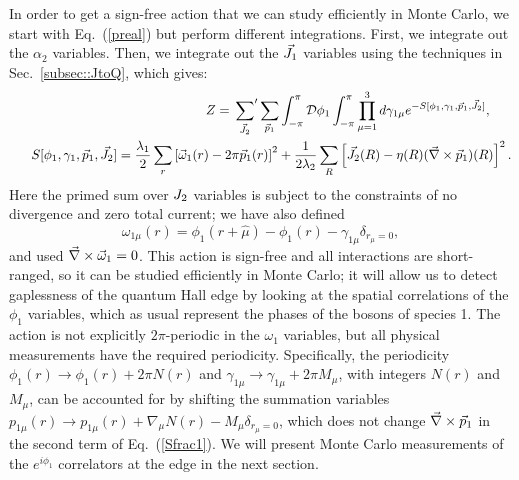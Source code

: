 In order to get a sign-free action that we can study efficiently in Monte Carlo, we start with Eq.~(\ref{preal}) but perform different integrations. 
First, we integrate out the $\alpha_{2}$ variables. Then, we integrate out the $\vec{J}_1$ variables using the techniques in Sec.~\ref{subsec::JtoQ}, which gives:
\begin{eqnarray}
&&Z=\sideset{}{'}\sum_{\vec{J}_2}  \sum_{\vec{p}_1}  \int_{-\pi}^{\pi}  \mathcal{D}\phi_1 \int_{-\pi}^{\pi} \prod_{\mu=1}^{3} d\gamma_{1\mu}
e^{-S[\phi_1,\gamma_1,\vec{p}_1,\vec{J}_2]} , ~~~~~
\label{Zint} \\
&&~~ S[\phi_1,\gamma_1,\vec{p}_1,\vec{J}_2] =
\frac{\lambda_1}{2}\sum_{r} \left[\vec{\omega}_{1}(r)-2\pi \vec{p}_1(r) \right]^2 
+ \frac{1}{2\lambda_2}\sum_R \left[\vec{J}_2(R)-\eta(R)(\vec{\nabla}\times\vec{p}_1)(R) \right]^2.
\label{Sfrac1}
\end{eqnarray}
Here the primed sum over $J_2$ variables is subject to the constraints of no divergence and zero total current; we have also defined
\begin{equation}
\omega_{1\mu}(r)=\phi_1(r+\hat{\mu})-\phi_1(r)-\gamma_{1\mu}\delta_{r_\mu=0},
\label{omega}
\end{equation}
and used $\vec{\nabla}\times\vec{\omega}_1 = 0$.
This action is sign-free and all interactions are short-ranged, so it can be studied efficiently in Monte Carlo; it will allow us to detect gaplessness of the quantum Hall edge by looking at the spatial correlations of the $\phi_1$ variables, which as usual represent the phases of the bosons of species 1. The action is not explicitly $2\pi$-periodic in the $\omega_1$ variables, but all physical measurements have the required periodicity.  Specifically, the periodicity $\phi_1(r) \to \phi_1(r) + 2\pi N(r)$ and $\gamma_{1\mu} \to \gamma_{1\mu} + 2\pi M_\mu$, with integers $N(r)$ and $M_\mu$, can be accounted for by shifting the summation variables $p_{1\mu}(r) \to p_{1\mu}(r) + \nabla_\mu N(r) - M_\mu \delta_{r_\mu = 0}$, which does not change $\vec{\nabla}\times\vec{p}_1$ in the second term of Eq.~(\ref{Sfrac1}). 
We will present Monte Carlo measurements of the $e^{i\phi_1}$ correlators at the edge in the next section.

